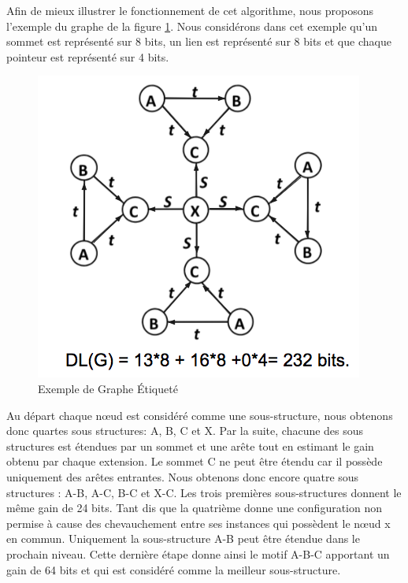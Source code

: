 \documentclass[a4paper,oneside,12pt]{report}
\theoremstyle{definition}
\begin{document}
\begin{enumerate}
\begin{algorithm}[H]
\begin{algorithmic} [1]
				\end{algorithmic}
			\end{algorithm}
			
Afin de mieux illustrer le fonctionnement de cet algorithme, nous proposons l'exemple du graphe de la figure \ref{beam}. Nous considérons dans cet exemple qu'un sommet est représenté sur 8 bits, un lien est représenté sur 8 bits et que chaque pointeur est représenté sur 4 bits.


\begin{figure}[H]
	\centering
	
	\includegraphics[scale=0.5]{ressources/image/beam_search.png}
	\caption{Exemple de Graphe Étiqueté}
	\label{beam}
 \end{figure}
 
 Au départ chaque nœud est considéré comme une sous-structure, nous obtenons donc quartes sous structures:  A, B, C et X. Par la suite, chacune des sous structures  est étendues par un sommet et une arête tout en estimant le gain obtenu par chaque extension. Le sommet C  ne peut être étendu car il possède  uniquement des arêtes entrantes. Nous obtenons donc encore quatre sous structures : A-B, A-C, B-C et X-C. Les trois premières sous-structures donnent le même gain de 24 bits. Tant dis que la quatrième donne une configuration non permise à cause des chevauchement entre ses instances qui possèdent le nœud x  en commun. Uniquement la sous-structure A-B peut être étendue dans le prochain niveau. Cette dernière étape donne ainsi le motif A-B-C apportant un gain de 64 bits et qui est considéré comme la meilleur sous-structure.  
 

\end{enumerate}
\end{document}
